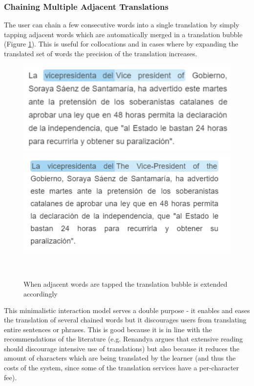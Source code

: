 \subsubsection{Chaining Multiple Adjacent Translations}
The user can chain a few consecutive words into a single translation by simply tapping adjacent words which are automatically merged in a translation bubble (Figure \ref{fig:translation_extension}). This is useful for collocations and in cases where by expanding the translated set of words the precision of the translation increases. 

    \begin{figure}[h!]
    \centering
      \includegraphics[width=0.8\columnwidth]{figures/translated_words1}
      \includegraphics[width=0.8\columnwidth]{figures/translated_words2}
      \caption{When adjacent words are tapped the translation bubble is extended accordingly}~\label{fig:translation_extension}
    \end{figure}

This minimalistic interaction model serves a double purpose - it enables and eases the translation of several chained words but it discourages users from translating entire sentences or phrases. This is good because it is in line with the recommendations of the literature (e.g. Renandya argues that extensive reading should discourage intensive use of translations\cite{renadya07-power}) but also because it reduces the amount of characters which are being translated by the learner (and thus the costs of the system, since some of the translation services have a per-character fee). 

